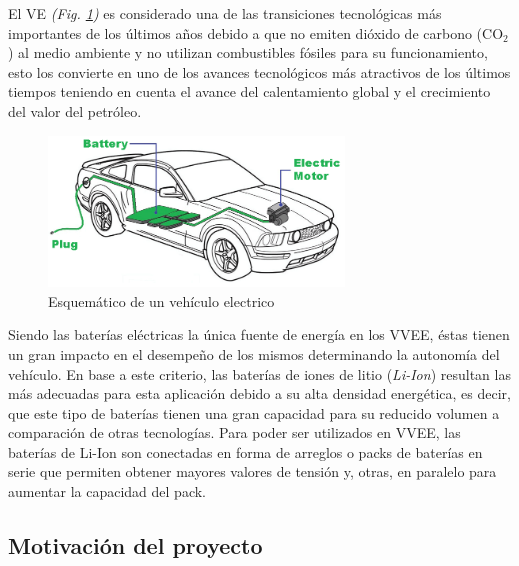 \documentclass[10pt,a4paper]{article}
\begin{document}
\noindent El \acrfull{VE} \emph{(Fig. \ref{EV})} es considerado 
una de las transiciones tecnológicas más importantes de los últimos años 
debido a que no emiten dióxido de carbono ($\mathrm{CO_2}$) al medio 
ambiente y no utilizan combustibles fósiles para su funcionamiento, esto 
los convierte en uno de los avances tecnológicos más atractivos de los 
últimos tiempos teniendo en cuenta el avance del calentamiento global y el 
crecimiento del valor del petróleo.

\begin{figure}[h!]
    \begin{center}
	\includegraphics[width=0.7\textwidth]{EV.png}
	\caption{Esquem\'atico de un veh\'iculo electrico}
	\label{EV}
    \end{center}
\end{figure}

\noindent Siendo las baterías eléctricas la única fuente de energía en los 
\acrfull{VVEE}, éstas tienen un gran impacto en el desempeño de los mismos 
determinando la autonomía del vehículo. En base a este criterio, las 
baterías de iones de litio (\emph{Li-Ion}) resultan las más adecuadas para 
esta aplicación debido a su alta densidad energética, es decir, que este 
tipo de baterías tienen una gran capacidad para su reducido volumen a 
comparación de otras tecnologías. Para poder ser utilizados en
\acrshort{VVEE}, las baterías de Li-Ion son conectadas en forma de arreglos 
o packs de baterías en serie que permiten obtener mayores valores de tensión
y, otras, en paralelo para aumentar la capacidad del pack.

\subsection{Motivaci\'on del proyecto}
\end{document}

